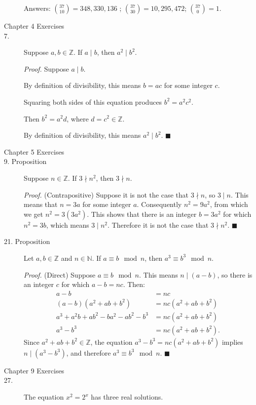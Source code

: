 \documentclass{article}
\newcommand{\qed}{\hfill\ensuremath{\blacksquare}}
\begin{document}
\begin{description}
  Answers:  ${37 \choose 10} = 348,330,136$ ; ${37 \choose 30} =
  10,295,472$; $ {37 \choose 0} = 1$.

\item[Chapter 4 Exercises]
\item[7.]  Suppose $a,b\in\mathbb{Z}$.  If $a \mid b$, then $a^2 \mid
    b^2$.

    {\em Proof.}  Suppose $a \mid b$.

    By definition of divisibility, this means $b=ac$ for some integer
    $c$.

    Squaring both sides of this equation produces $b^2=a^2c^2$.

    Then $b^2=a^2d$, where $d=c^2\in\mathbb{Z}$.

    By definition of divisibility, this means $a^2 \mid b^2$.
    \qed

\item[Chapter 5 Exercises]

\item[9. Proposition]  Suppose $n\in\mathbb{Z}$.  If $3 \nmid n^2$,
  then $3 \nmid n$.

  {\em Proof.}  (Contrapositive) Suppose it is not the case that
  $3\nmid n$, so $3 \mid n$.  This means that $n=3a$ for some integer
  $a$.  Consequently $n^2 = 9a^2$, from which we get $n^2=3(3a^2)$.
  This shows that there is an integer $b=3a^2$ for which $n^2=3b$,
  which means $3\mid n^2$.  Therefore it is not the case that $3\nmid
  n^2$.  
  \qed

  
 \item[21. Proposition]  Let $a,b\in\mathbb{Z}$ and $n\in\mathbb{N}$.
   If $a\equiv b \mod{n}$, then $a^3\equiv b^3\mod{n}$.

   {\em Proof.}  (Direct) Suppose $a\equiv b\mod{n}$.  This means
   $n\mid(a-b)$, so there is an integer $c$ for which $a-b=nc$.  Then:
   \begin{align*}
     a-b &= nc\\
     (a-b)(a^2 + ab+b^2) &= nc(a^2 + ab + b^2)\\
     a^3 + a^2b + ab^2 -ba^2 -ab^2 - b^3 &= nc(a^2+ ab + b^2)\\
     a^3 -b^3  &= nc(a^2+ ab + b^2).
   \end{align*}
   Since $a^2 + ab + b^2\in\mathbb{Z}$, the equation $a^3-b^3=nc(a^2+
   ab + b^2)$ implies $n\mid (a^3-b^3)$, and therefore $a^3\equiv
   b^3\mod{n}$.     \qed

\item[Chapter 9 Exercises]
\item[27.] The equation $x^2=2^x$ has three real solutions.


\end{description}
\end{document}
